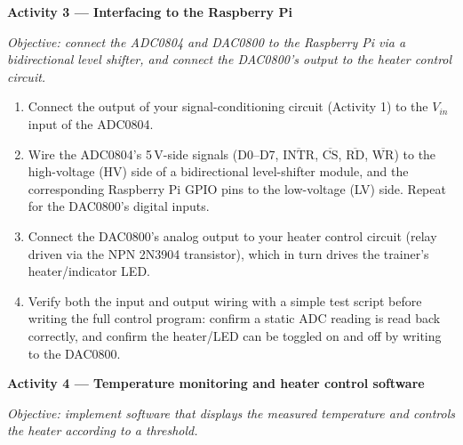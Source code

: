 \begin{procedure}
  \textbf{Activity 3 --- Interfacing to the Raspberry Pi}\vspace{2pt}

  \textit{Objective: connect the ADC0804 and DAC0800 to the Raspberry Pi via a bidirectional level shifter, and connect the DAC0800's output to the heater control circuit.}

  \begin{enumerate}
    \item Connect the output of your signal-conditioning circuit (Activity 1) to the $V_{in}$ input of the ADC0804.
    \item Wire the ADC0804's 5\,V-side signals (D0--D7, $\overline{\text{INTR}}$, $\overline{\text{CS}}$, $\overline{\text{RD}}$, $\overline{\text{WR}}$) to the high-voltage (HV) side of a bidirectional level-shifter module, and the corresponding Raspberry Pi GPIO pins to the low-voltage (LV) side. Repeat for the DAC0800's digital inputs.
    \item Connect the DAC0800's analog output to your heater control circuit (relay driven via the NPN 2N3904 transistor), which in turn drives the trainer's heater/indicator LED.
    \item Verify both the input and output wiring with a simple test script before writing the full control program: confirm a static ADC reading is read back correctly, and confirm the heater/LED can be toggled on and off by writing to the DAC0800.
  \end{enumerate}

  \textbf{Activity 4 --- Temperature monitoring and heater control software}\vspace{2pt}

  \textit{Objective: implement software that displays the measured temperature and controls the heater according to a threshold.}


\end{procedure}

